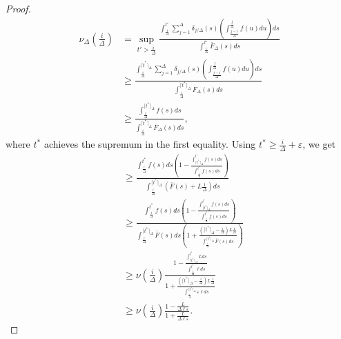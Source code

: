 \documentclass[11pt]{article}
\renewcommand{\epsilon}{\varepsilon}
\renewcommand{\geq}{\geqslant}
\begin{document}
\begin{proof}
    \begin{align*}
        \nu_\Delta(\frac{i}{\Delta}) 
        &= \sup_{t'> \frac{i}{\Delta}} \frac{\int_{\frac{i}{\Delta}}^{t'}
            \sum_{j=1}^{\Delta}
         \delta_{j/\Delta}(s)  \left( \int_{\frac{j-1}{\Delta}}^{\frac{j}{\Delta}} f(u) du \right) ds}{\int_{\frac{i}{\Delta}}^{t'} \bar{F}_\Delta(s) ds}
        \\
        &\geq \frac{\int_{\frac{i}{\Delta}}^{\lceil t^* \rceil_\Delta}
        \sum_{j=1}^{\Delta}
        \delta_{j/\Delta}(s)  \left( \int_{\frac{j-1}{\Delta}}^{\frac{j}{\Delta}} f(u) du \right) ds}{\int_{\frac{i}{\Delta}}^{\lceil t^*
            \rceil_\Delta}
        \bar{F}_\Delta(s) ds} \\
        &\geq \frac {
            \int_{\frac{i}{\Delta}}^{\lceil t^* \rceil_\Delta} f(s) ds
        }{
            \int_{\frac{i}{\Delta}}^{\lceil t^* \rceil_\Delta} \bar{F}_\Delta(s) ds
          },
    \end{align*}
    where $t^*$ achieves the supremum  in the first equality.
    Using $t^* \geq \frac{i}{\Delta} + \epsilon$, we get
    \begin{align*}
        &\geq \frac{
            \int_{\frac{i}{\Delta}}^{t^*} f(s) ds\left(1 - \frac{\int_{\lceil
            t^* \rceil_\Delta}^{t^*} f(s) ds}{\int_{\frac{i}{\Delta}}^{t^*}
            f(s)ds}\right)
        }{
            \int_{\frac{i}{\Delta}}^{\lceil t^* \rceil_\Delta} (\bar{F}(s) + L\frac{1}{\Delta}) ds
        } \\
        &\geq \frac{
            \int_{\frac{i}{\Delta}}^{t^*} f(s) ds\left(1 - \frac{\int_{\lceil
            t^* \rceil_\Delta}^{t^*} f(s) ds}{\int_{\frac{i}{\Delta}}^{t^*}
            f(s)ds}\right)
        }{
            \int_{\frac{i}{\Delta}}^{\lceil t^* \rceil_\Delta} \bar{F}(s) ds \left(1 +
            \frac{(\lceil t^* \rceil_\Delta - \frac{i}{\Delta})L \frac{1}{\Delta}}{
            \int_{\frac{i}{\Delta}}^{\lceil t^* \rceil_\Delta} \bar{F}(s) ds}\right)
        } \\
        &\geq \nu(\frac{i}{\Delta}) \frac{
            1 - \frac{\int_{\lceil t^* \rceil_\Delta}^{t^*} L
            ds}{\int_{\frac{i}{\Delta}}^{t^*} \ell ds}
        }{
            1 + \frac{(\lceil t^* \rceil_\Delta - \frac{i}{\Delta})L\frac{1}{\Delta}}{
            \int_{\frac{i}{\Delta}}^{\lceil t^* \rceil_\Delta} \epsilon \ell ds}
        } \\
        &\geq \nu(\frac{i}{\Delta}) \frac{
            1 -\frac{L}{\Delta \ell \epsilon}
        }{
            1 + \frac{L}{\Delta \ell \epsilon}
        }.
    \end{align*}
\end{proof}
\end{document}
